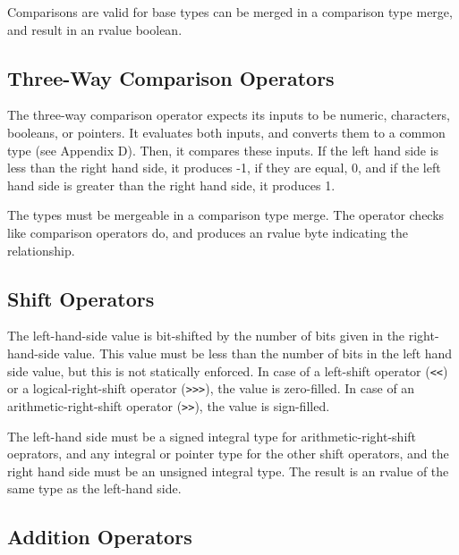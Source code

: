 \documentclass[letterpaper,12pt]{book}
\begin{document}


Comparisons are valid for base types can be merged in a comparison type merge, and result in an rvalue boolean.

\subsection{Three-Way Comparison Operators}



The three-way comparison operator expects its inputs to be numeric, characters, booleans, or pointers. It evaluates both inputs, and converts them to a common type (see Appendix D). Then, it compares these inputs. If the left hand side is less than the right hand side, it produces -1, if they are equal, 0, and if the left hand side is greater than the right hand side, it produces 1.

The types must be mergeable in a comparison type merge. The operator checks like comparison operators do, and produces an rvalue byte indicating the relationship.

\subsection{Shift Operators}



The left-hand-side value is bit-shifted by the number of bits given in the right-hand-side value. This value must be less than the number of bits in the left hand side value, but this is not statically enforced. In case of a left-shift operator (\texttt{<<}) or a logical-right-shift operator (\texttt{>>>}), the value is zero-filled. In case of an arithmetic-right-shift operator (\texttt{>>}), the value is sign-filled.

The left-hand side must be a signed integral type for arithmetic-right-shift oeprators, and any integral or pointer type for the other shift operators, and the right hand side must be an unsigned integral type. The result is an rvalue of the same type as the left-hand side.

\subsection{Addition Operators}
\end{document}
